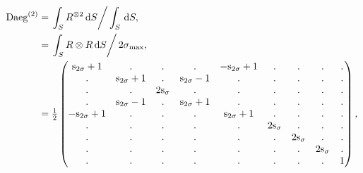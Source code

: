 \documentclass[a4paper,11pt,twoside,openright]{book}
\def\lthtmlcheckvsize{\ifdim\ht\sizebox<\vsize 
  \ifdim\wd\sizebox<\hsize\expandafter\hfill\fi \expandafter\vfill
  \else\expandafter\vss\fi}%
\begin{document}
{\newpage\clearpage
\setcounter{equation}{13}
%
\begin{subequations}\begin{align}
\textrm{Daeg}^{(2)}&= \left. \int_S R^{\otimes 2} \,\mathrm{d}S \right / \int_S \,\mathrm{d}S, \\
&= \left. \int_S R \otimes R \,\mathrm{d}S \right / 2\sigma_{\textrm{max}}, \\
&= \tfrac{1}{2}\begin{pmatrix}
\textrm{s}_{2\sigma}+1  & .               & .           & .               & -\textrm{s}_{2\sigma}+1 & .           & .           & .           & . \\
.                & \textrm{s}_{2\sigma}+1 & .           & \textrm{s}_{2\sigma}-1 & .                & .           & .           & .           & . \\
.                & .               & 2\textrm{s}_\sigma & .               & .                & .           & .           & .           & . \\
.                & \textrm{s}_{2\sigma}-1 & .           & \textrm{s}_{2\sigma}+1 & .                & .           & .           & .           & . \\
-\textrm{s}_{2\sigma}+1 & .               & .           & .               & \textrm{s}_{2\sigma}+1  & .           & .           & .           & . \\
.                & .               & .           & .               & .                & 2\textrm{s}_\sigma & .           & .           & . \\
.                & .               & .           & .               & .                & .           & 2\textrm{s}_\sigma & .           & . \\
.                & .               & .           & .               & .                & .           & .           & 2\textrm{s}_\sigma & . \\
.                & .               & .           & .               & .                & .           & .           & .           & 1 \\
\end{pmatrix} ,
\end{align}\end{subequations}%
\lthtmldisplayZ
\lthtmlcheckvsize\clearpage}
\end{document}
